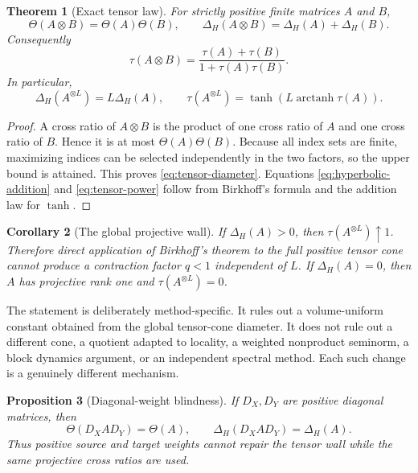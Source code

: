 \documentclass[11pt]{article}
\newtheorem{theorem}{Theorem}[section]
\newtheorem{proposition}[theorem]{Proposition}
\newtheorem{corollary}[theorem]{Corollary}
\newcommand{\diamH}{\Delta_{H}}
\newcommand{\1}{\mathbf{1}}
\begin{document}
\begin{theorem}[Exact tensor law]\label{thm:tensor}
For strictly positive finite matrices $A$ and $B$,
\begin{equation}\label{eq:tensor-diameter}
 \Theta(A\otimes B)=\Theta(A)\Theta(B),\qquad
 \diamH(A\otimes B)=\diamH(A)+\diamH(B).
\end{equation}
Consequently
\begin{equation}\label{eq:hyperbolic-addition}
 \tau(A\otimes B)=
 \frac{\tau(A)+\tau(B)}{1+\tau(A)\tau(B)}.
\end{equation}
In particular,
\begin{equation}\label{eq:tensor-power}
 \diamH(A^{\otimes L})=L\diamH(A),\qquad
 \tau(A^{\otimes L})=
 \tanh\!\left(L\operatorname{arctanh}\tau(A)\right).
\end{equation}
\end{theorem}

\begin{proof}
A cross ratio of $A\otimes B$ is the product of one cross ratio of $A$ and
one cross ratio of $B$.  Hence it is at most $\Theta(A)\Theta(B)$.  Because
all index sets are finite, maximizing indices can be selected independently
in the two factors, so the upper bound is attained.  This proves
\eqref{eq:tensor-diameter}.  Equations \eqref{eq:hyperbolic-addition} and
\eqref{eq:tensor-power} follow from Birkhoff's formula and the addition law
for $\tanh$.
\end{proof}

\begin{corollary}[The global projective wall]\label{cor:wall}
If $\diamH(A)>0$, then $\tau(A^{\otimes L})\uparrow1$.  Therefore direct
application of Birkhoff's theorem to the full positive tensor cone cannot
produce a contraction factor $q<1$ independent of $L$.  If $\diamH(A)=0$,
then $A$ has projective rank one and $\tau(A^{\otimes L})=0$.
\end{corollary}

The statement is deliberately method-specific.  It rules out a
volume-uniform constant obtained from the global tensor-cone diameter.  It
does not rule out a different cone, a quotient adapted to locality, a
weighted nonproduct seminorm, a block dynamics argument, or an independent
spectral method.  Each such change is a genuinely different mechanism.

\begin{proposition}[Diagonal-weight blindness]\label{prop:diagonal}
If $D_X,D_Y$ are positive diagonal matrices, then
\[
 \Theta(D_XAD_Y)=\Theta(A),\qquad \diamH(D_XAD_Y)=\diamH(A).
\]
Thus positive source and target weights cannot repair the tensor wall while
the same projective cross ratios are used.
\end{proposition}
\end{document}
